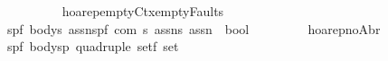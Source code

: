 \begin{isabellebody}
\ \ \ \ {\isacharparenleft}{\isachardoublequoteopen}{\isacharparenleft}{}{\isacharunderscore}{\isacharslash}{\isasymturnstile}\isactrlbsub {\isacharprime}{\isacharslash}{\isacharunderscore}\isactrlesub \ {\isacharparenleft}{\isacharunderscore}{\isacharslash}\ {\isacharparenleft}{\isacharunderscore}{\isacharparenright}{\isacharslash}\ {\isacharunderscore}{\isacharcomma}{\isacharslash}{\isacharunderscore}{\isacharparenright}{\isacharparenright}{\isachardoublequoteclose}\ {\isacharbrackleft}{}{}{\isacharcomma}{}{}{\isacharcomma}{}{}{}{}{\isacharcomma}{}{}{\isacharcomma}{}{}{}{}{\isacharcomma}{}{}{}{}{\isacharbrackright}{}{}{\isacharparenright}\isanewline
\isanewline
{\isachardoublequoteopen}{\isacharunderscore}hoarep{\isacharunderscore}emptyCtx{\isacharunderscore}emptyFaults{\isachardoublequoteclose}{\isacharcolon}{\isacharcolon}\isanewline
{\isachardoublequoteopen}{\isacharbrackleft}{\isacharparenleft}{\isacharprime}s{\isacharcomma}{\isacharprime}p{\isacharcomma}{\isacharprime}f{\isacharparenright}\ body{\isacharcomma}{\isacharprime}s\ assn{\isacharcomma}{\isacharparenleft}{\isacharprime}s{\isacharcomma}{\isacharprime}p{\isacharcomma}{\isacharprime}f{\isacharparenright}\ com{\isacharcomma}\ {\isacharprime}s\ assn{\isacharcomma}{\isacharprime}s\ assn{\isacharbrackright}\ {\isacharequal}{\isachargreater}\ bool{\isachardoublequoteclose}\isanewline
\ \ \ \ {\isacharparenleft}{\isachardoublequoteopen}{\isacharparenleft}{}{\isacharunderscore}{\isacharslash}{\isasymturnstile}\ {\isacharparenleft}{\isacharunderscore}{\isacharslash}\ {\isacharparenleft}{\isacharunderscore}{\isacharparenright}{\isacharslash}\ {\isacharunderscore}{\isacharcomma}{\isacharslash}{\isacharunderscore}{\isacharparenright}{\isacharparenright}{\isachardoublequoteclose}\ {\isacharbrackleft}{}{}{\isacharcomma}{}{}{}{}{\isacharcomma}{}{}{\isacharcomma}{}{}{}{}{\isacharcomma}{}{}{}{}{\isacharbrackright}{}{}{\isacharparenright}\isanewline
\isanewline
{\isachardoublequoteopen}{\isacharunderscore}hoarep{\isacharunderscore}noAbr{\isachardoublequoteclose}{\isacharcolon}{\isacharcolon}\isanewline
{\isachardoublequoteopen}{\isacharbrackleft}{\isacharparenleft}{\isacharprime}s{\isacharcomma}{\isacharprime}p{\isacharcomma}{\isacharprime}f{\isacharparenright}\ body{\isacharcomma}{\isacharparenleft}{\isacharprime}s{\isacharcomma}{\isacharprime}p{\isacharparenright}\ quadruple\ set{\isacharcomma}{\isacharprime}f\ set{\isacharcomma}\isanewline

\end{isabellebody}
